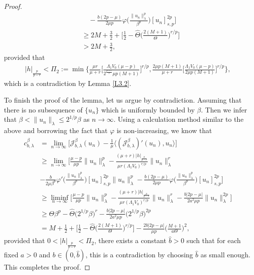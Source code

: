 \documentclass[10pt,a4paper]{amsart}
\numberwithin{equation}{section}
\begin{document}
\begin{proof}
\begin{align*}
&\quad -\frac{b(2p-\mu)}{2\mu p}\varphi\Big( \frac{\|u_n\|^p_\lambda}{\beta^p}\Big)
  [u_n]^{2p}_{s,p}\Big]  \\
&\geq 2M+\frac{3}{2}+\Big[\frac{1}{2}-\widehat{\Theta} 
 \Big(\frac{2(M+1)}{\Theta}\Big)^{r/p} \Big]  \\
&> 2M+\frac{3}{2},
\end{align*}
provided that
\begin{align*}
|h|_{\frac{p}{p-r}}
<\Pi_2:=\min\Big\{\frac{\mu r}{\mu+r} \Big[\frac{\Lambda_1 V_0(\mu-p)}{2^{\frac{p+r}{r}}
 \mu p(M+1)}\Big]^{r/p},
\frac{2\mu p(M+1)}{\mu+r}\Big[\frac{\Lambda_1 V_0(\mu-p)}{2\mu p(M+1)}
 \Big]^{r/p}\Big\},
\end{align*}
which is a contradiction by Lemma \ref{L3.2}.

To finish the proof of the lemma, let us argue by contradiction. 
Assuming that there is no subsequence of $\{u_n\}$ which is uniformly bounded by 
$\beta$. Then we infer that $\beta<\|u_n\|_\lambda \leq 2^{1/p}\beta$ as
$n\to  \infty$. Using a calculation method similar to the above and borrowing the 
fact that $\varphi$ is non-increasing, we know that
\begin{align*}
 c_{b,\lambda}^\beta
&= \lim_{n\to \infty} \Big[\mathcal{J}^\beta_{b,\lambda}(u_n)-\frac{1}{\mu} \langle (\mathcal{J}^\beta_{b,\lambda})'(u_n), u_n\rangle \Big]    \\
&\geq \lim_{n\to \infty} \Big[\frac{\mu-p}{\mu p}\|u_n\|^p_\lambda-\frac{(\mu+r)|h|_{\frac{p}{p-r}}}{\mu r (\Lambda_1 V_0)^{r/p}}\|u_n\|^r_\lambda   \\
&-\frac{b}{2\mu\beta^p} \varphi'\Big( \frac{\|u_n\|^p_\lambda}{\beta^p}\Big) [u_n]^{2p}_{s,p}\|u_n\|^p_\lambda
-\frac{b(2p-\mu)}{2\mu p}\varphi\Big( \frac{\|u_n\|^p_\lambda}{\beta^p}\Big) [u_n]^{2p}_{s,p}\Big]  \\
&\geq \liminf_{n\to \infty} \Big[\frac{\mu-p}{\mu p}\|u_n\|^p_\lambda-\frac{(\mu+r)|h|_{\frac{p}{p-r}}}{\mu r (\Lambda_1 V_0)^{r/p}}\|u_n\|^r_\lambda-\frac{b|2p-\mu|}{2a^2\mu p} \|u_n\|^{2p}_\lambda\Big]  \\
&\geq \Theta\beta^p-\widehat{\Theta}\Big(2^{1/p}\beta\Big)^r-\frac{b|2p-\mu|}{2a^2\mu p}\Big(2^{1/p}\beta\Big)^{2p}   \\
&= M+\frac{1}{2}+\Big[\frac{1}{2}-\widehat{\Theta} \Big(\frac{2(M+1)}{\Theta}\Big)^{r/p}\Big]-\frac{2b|2p-\mu|}{\mu p} \Big(\frac{M+1}{a\Theta}\Big)^2,
\end{align*}
provided that $0<|h|_{\frac{p}{p-r}}<\Pi_2$, there exists a constant $\widehat{b}>0$ 
such that for each fixed $a>0$ and $b\in(0, \widehat{b})$, this is a contradiction 
by choosing $\widehat{b}$ as small enough. This completes the proof.
\end{proof}
\end{document}
